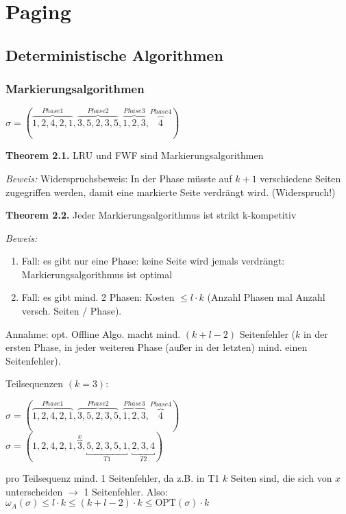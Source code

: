 \chapter{Paging}

\section{Deterministische Algorithmen}

\subsection{Markierungsalgorithmen}
$\sigma = (\overbrace{1, 2, 4, 2, 1}^{Phase 1},\overbrace{3, 5, 2, 3, 5}^{Phase 2},\overbrace{1, 2, 3}^{Phase 3},\overbrace{4}^{Phase 4})$



\textbf{Theorem 2.1.} LRU und FWF sind Markierungsalgorithmen

\textit{Beweis:} Widerspruchsbeweis: In der Phase müsste auf $k + 1$ verschiedene Seiten zugegriffen werden, damit eine markierte Seite verdrängt wird. (Widerspruch!)



\textbf{Theorem 2.2.} Jeder Markierungsalgorithmus ist strikt k-kompetitiv

\textit{Beweis:}
\begin{enumerate}
\item Fall: es gibt nur eine Phase: keine Seite wird jemals verdrängt: Markierungsalgorithmus ist optimal
\item Fall: es gibt mind. 2 Phasen: Kosten $\le l \cdot k$ (Anzahl Phasen mal Anzahl versch. Seiten / Phase).
\end{enumerate}
Annahme: opt. Offline Algo. macht mind. $(k + l - 2)$ Seitenfehler ($k$ in der ersten Phase, in jeder weiteren Phase (außer in der letzten) mind. einen Seitenfehler).

Teilsequenzen $(k=3)$:

$\sigma = (\overbrace{1, 2, 4, 2, 1}^{Phase 1},\overbrace{3, 5, 2, 3, 5}^{Phase 2},\overbrace{1, 2, 3}^{Phase 3},\overbrace{4}^{Phase 4})$\\
$\sigma = (1, 2, 4, 2, 1, \overbracket{3}^{x}, \underbracket{5, 2, 3, 5, 1}_{T1}, \underbracket{2, 3, 4}_{T2})$

pro Teilsequenz mind. 1 Seitenfehler, da z.B. in T1 $k$ Seiten sind, die sich von $x$ unterscheiden $\to$ 1 Seitenfehler.
Also: $\omega_{A}(\sigma) \le l \cdot k \le (k + l - 2) \cdot k \le \textrm{OPT}(\sigma) \cdot k$



